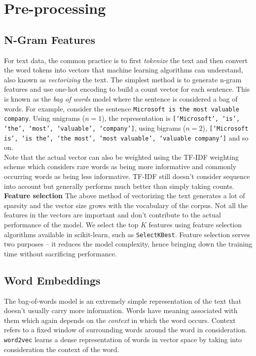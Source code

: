 \documentclass{article}
\begin{document}
\section{Pre-processing}

\subsection{N-Gram Features}
For text data, the common practice is to first \textit{tokenize} the text and then convert the word tokens into vectors that machine learning algorithms can understand, also known as \textit{vectorizing} the text. The simplest method is to generate n-gram features and use one-hot encoding to build a count vector for each sentence. This is known as the \textit{bag of words} model where the sentence is considered a bag of words. For example, consider the sentence \texttt{Microsoft is the most valuable company}. Using unigrams ($n = 1$), the representation is \texttt{[`Microsoft', `is', `the', `most', `valuable', `company']}, using bigrams ($n = 2$), \texttt{[`Microsoft is', `is the', `the most', `most valuable', `valuable company']} and so on.
\\

Note that the actual vector can also be weighted using the TF-IDF weighting scheme which considers rare words as being more informative and commonly occurring words as being less informative. TF-IDF still doesn't consider sequence into account but generally performs much better than simply taking counts. 
\\

\textbf{Feature selection} The above method of vectorizing the text generates a lot of sparsity and the vector size grows with the vocabulary of the corpus. Not all the features in the vectors are important and don't contribute to the actual performance of the model. We select the top $K$ features using feature selection algorithms available in scikit-learn, such as \texttt{SelectKBest}. Feature selection serves two purposes -- it reduces the model complexity, hence bringing down the training time without sacrificing performance.

\subsection{Word Embeddings}
The bag-of-words model is an extremely simple representation of the text that doesn't usually carry more information. Words have meaning associated with them which again depends on the \textit{context} in which the word occurs. Context refers to a fixed window of surrounding words around the word in consideration. \texttt{word2vec} learns a dense representation of words in vector space by taking into consideration the context of the word.
\\
\end{document}
